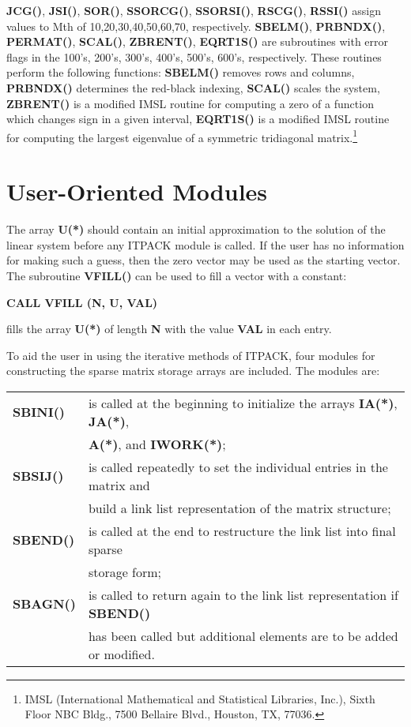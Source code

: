 \noindent
{\bf JCG()}, {\bf JSI()}, {\bf SOR()}, {\bf SSORCG()}, {\bf SSORSI()}, 
{\bf RSCG()}, {\bf RSSI()} assign values to Mth of 10,20,30,40,50,60,70, 
respectively.  {\bf SBELM()}, {\bf PRBNDX()}, {\bf PERMAT()},
{\bf SCAL()}, {\bf ZBRENT()}, {\bf EQRT1S()} are subroutines with
error flags in the 100's, 200's, 300's, 400's, 500's, 600's, respectively.
These routines perform the following functions:  {\bf SBELM()} removes 
rows and columns, {\bf PRBNDX()} determines the red-black indexing, 
{\bf SCAL()} scales the system, {\bf ZBRENT()} is a modified IMSL routine 
for computing a zero of a function which changes sign in a given 
interval, {\bf EQRT1S()} is a modified IMSL routine for computing the 
largest eigenvalue of a symmetric tridiagonal matrix.\footnote{IMSL 
(International Mathematical and Statistical Libraries, Inc.),
Sixth Floor NBC Bldg., 7500 Bellaire Blvd., Houston, TX, 77036.}

\section{User-Oriented Modules}
\label{modules}
 
The array {\bf U(*)} should contain an initial approximation to the 
solution of the linear system before any ITPACK module is called.  If 
the user has no information for making such a guess, then the zero vector 
may be used as the starting vector.  The subroutine {\bf VFILL()} can be 
used to fill a vector with a constant:
 
\bigskip
\centerline{\bf CALL VFILL (N, U, VAL)}
\bigskip
 
\noindent
fills the array {\bf U(*)} of length {\bf N} with the value {\bf VAL} in 
each entry.
 
To aid the user in using the iterative methods of ITPACK, four modules
for constructing the sparse matrix storage arrays are included.  The
modules are:
 
\bigskip
\begin{tabular}{ll} 
 {\bf SBINI()} & is called at the beginning to initialize the arrays 
                 {\bf IA(*)}, {\bf JA(*)}, \\
               & {\bf A(*)}, and {\bf IWORK(*)}; \\
 {\bf SBSIJ()} & is called repeatedly to set the individual entries in the
                 matrix and \\
               & build a link list representation of the matrix 
                 structure; \\
 {\bf SBEND()} & is called at the end to restructure the link list into
                 final sparse \\
               & storage form; \\
 {\bf SBAGN()} & is called to return again to the link list representation
                 if {\bf SBEND()} \\
               & has been called but additional elements are
                 to be added or modified.
\end{tabular} 
\bigskip

